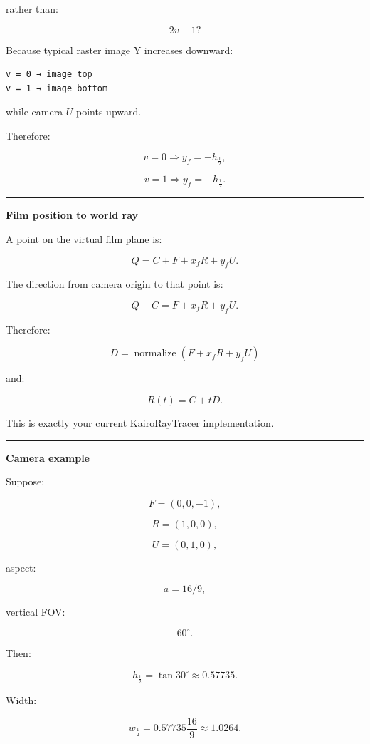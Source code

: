 rather than:

\[
2v-1?
\]

Because typical raster image Y increases downward:

\begin{verbatim}
v = 0 → image top
v = 1 → image bottom
\end{verbatim}

while camera \(U\) points upward.

Therefore:

\[
v=0
\Rightarrow
y_f=+h_{\frac12},
\]

\[
v=1
\Rightarrow
y_f=-h_{\frac12}.
\]

\begin{center}\rule{0.5\linewidth}{0.5pt}\end{center}

\textbf{Film position to world ray}

A point on the virtual film plane is:

\[
Q=
C+
F+
x_fR+
y_fU.
\]

The direction from camera origin to that point is:

\[
Q-C
=
F+x_fR+y_fU.
\]

Therefore:

\[
\boxed{
D=
\operatorname{normalize}
(
F+x_fR+y_fU
)
}
\]

and:

\[
\boxed{
R(t)=C+tD.
}
\]

This is exactly your current KairoRayTracer  implementation.

\begin{center}\rule{0.5\linewidth}{0.5pt}\end{center}

\textbf{Camera example}

Suppose:

\[
F=(0,0,-1),
\]

\[
R=(1,0,0),
\]

\[
U=(0,1,0),
\]

aspect:

\[
a=16/9,
\]

vertical FOV:

\[
60^\circ.
\]

Then:

\[
h_{\frac12}
=
\tan30^\circ
\approx0.57735.
\]

Width:

\[
w_{\frac12}
=
0.57735\frac{16}{9}
\approx1.0264.
\]

